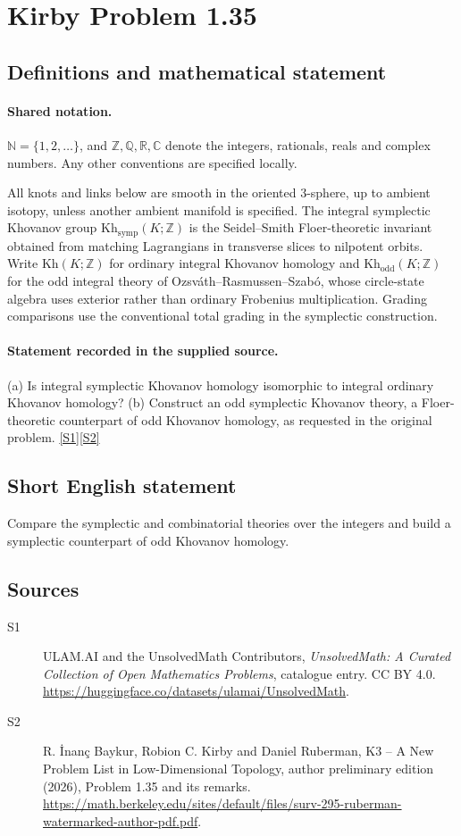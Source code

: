 \documentclass[11pt]{article}
\newcommand{\sref}[2]{\hyperlink{source:#1:#2}{[S#2]}}
\begin{document}
\section{Kirby Problem 1.35}\label{statement}

\subsection{Definitions and mathematical statement}

\paragraph{Shared notation.}$\mathbb N=\{1,2,\ldots\}$, and $\mathbb Z,\mathbb Q,\mathbb R,\mathbb C$ denote the integers, rationals, reals and complex numbers. Any other conventions are specified locally.


All knots and links below are smooth in the oriented $3$-sphere, up to ambient isotopy, unless another ambient manifold is specified. The integral symplectic Khovanov group $\mathrm{Kh}_{\mathrm{symp}}(K;\mathbb Z)$ is the Seidel--Smith Floer-theoretic invariant obtained from matching Lagrangians in transverse slices to nilpotent orbits. Write $\mathrm{Kh}(K;\mathbb Z)$ for ordinary integral Khovanov homology and $\mathrm{Kh}_{\mathrm{odd}}(K;\mathbb Z)$ for the odd integral theory of Ozsv\'ath--Rasmussen--Szab\'o, whose circle-state algebra uses exterior rather than ordinary Frobenius multiplication. Grading comparisons use the conventional total grading in the symplectic construction.
\paragraph{Statement recorded in the supplied source.}
(a) Is integral symplectic Khovanov homology isomorphic to integral ordinary Khovanov homology? (b) Construct an odd symplectic Khovanov theory, a Floer-theoretic counterpart of odd Khovanov homology, as requested in the original problem. \sref{statement}{1}\sref{statement}{2}
\subsection{Short English statement}
Compare the symplectic and combinatorial theories over the integers and build a symplectic counterpart of odd Khovanov homology.
\subsection{Sources}
\begin{description}
\item[\hypertarget{source:statement:1}{S1}] ULAM.AI and the UnsolvedMath Contributors, \emph{UnsolvedMath: A Curated Collection of Open Mathematics Problems}, catalogue entry. CC BY 4.0. \url{https://huggingface.co/datasets/ulamai/UnsolvedMath}.
\item[\hypertarget{source:statement:2}{S2}] R. \.{I}nan\c{c} Baykur, Robion C. Kirby and Daniel Ruberman, K3 -- A New Problem List in Low-Dimensional Topology, author preliminary edition (2026), Problem 1.35 and its remarks. \url{https://math.berkeley.edu/sites/default/files/surv-295-ruberman-watermarked-author-pdf.pdf}.
\end{description}
\label{end:statement}
\end{document}
